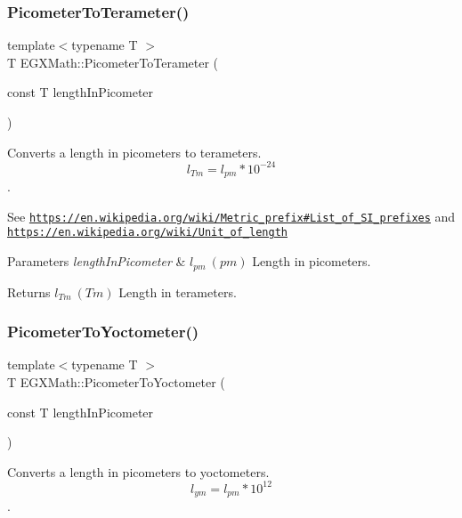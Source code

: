 \subsubsection{\texorpdfstring{Picometer\+To\+Terameter()}{PicometerToTerameter()}}
{\footnotesize\ttfamily template$<$typename T $>$ \\
T E\+G\+X\+Math\+::\+Picometer\+To\+Terameter (\begin{DoxyParamCaption}\item[{const T}]{length\+In\+Picometer }\end{DoxyParamCaption})}



Converts a length in picometers to terameters. \[ l_{Tm}=l_{pm} * 10^{-24} \]. 

See \href{https://en.wikipedia.org/wiki/Metric_prefix#List_of_SI_prefixes}{\tt https\+://en.\+wikipedia.\+org/wiki/\+Metric\+\_\+prefix\#\+List\+\_\+of\+\_\+\+S\+I\+\_\+prefixes} and \href{https://en.wikipedia.org/wiki/Unit_of_length}{\tt https\+://en.\+wikipedia.\+org/wiki/\+Unit\+\_\+of\+\_\+length} 
\begin{DoxyParams}{Parameters}
{\em length\+In\+Picometer} & $ l_{pm}\ (pm)$ Length in picometers. \\
\hline
\end{DoxyParams}
\begin{DoxyReturn}{Returns}
$ l_{Tm}\ (Tm)$ Length in terameters. 
\end{DoxyReturn}
\mbox{\label{group___e_g_x_math-_conversions-_length_conversions-_picometer-_s_i_ga503eda76d6647261c50ec147c78dfbbc}} 
\subsubsection{\texorpdfstring{Picometer\+To\+Yoctometer()}{PicometerToYoctometer()}}
{\footnotesize\ttfamily template$<$typename T $>$ \\
T E\+G\+X\+Math\+::\+Picometer\+To\+Yoctometer (\begin{DoxyParamCaption}\item[{const T}]{length\+In\+Picometer }\end{DoxyParamCaption})}



Converts a length in picometers to yoctometers. \[ l_{ym}=l_{pm} * 10^{12} \]. 

